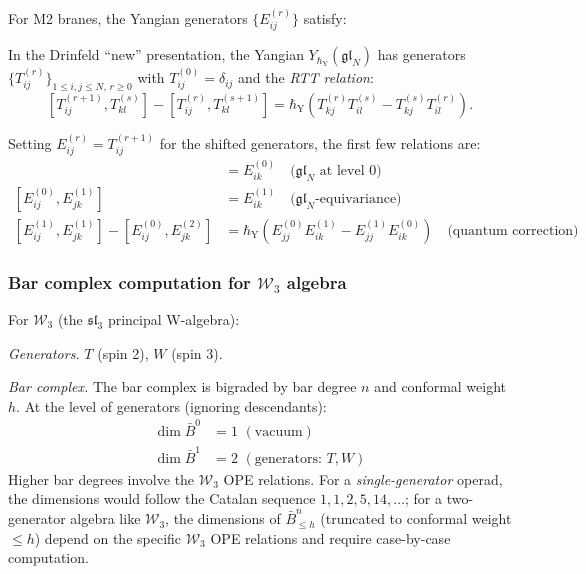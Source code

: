 \begin{calculation}
For M2 branes, the Yangian generators $\{E_{ij}^{(r)}\}$ satisfy:

In the Drinfeld ``new'' presentation, the Yangian
$Y_{\hbar_{\mathrm{Y}}}(\mathfrak{gl}_N)$ has generators
$\{T_{ij}^{(r)}\}_{1 \leq i,j \leq N,\, r \geq 0}$ with
$T_{ij}^{(0)} = \delta_{ij}$ and the \emph{RTT relation}:
\[
[T_{ij}^{(r+1)}, T_{kl}^{(s)}]
- [T_{ij}^{(r)}, T_{kl}^{(s+1)}]
=
\hbar_{\mathrm{Y}}\left(T_{kj}^{(r)} T_{il}^{(s)}
- T_{kj}^{(s)} T_{il}^{(r)}\right).
\]

Setting $E_{ij}^{(r)} = T_{ij}^{(r+1)}$ for the shifted generators, the first few relations are:
\begin{align}
[E_{ij}^{(0)}, E_{jk}^{(0)}] &= E_{ik}^{(0)} \quad \text{($\mathfrak{gl}_N$ at level 0)}\\
[E_{ij}^{(0)}, E_{jk}^{(1)}] &= E_{ik}^{(1)} \quad \text{($\mathfrak{gl}_N$-equivariance)}\\
[E_{ij}^{(1)}, E_{jk}^{(1)}] - [E_{ij}^{(0)}, E_{jk}^{(2)}] &= \hbar_{\mathrm{Y}}\left(E_{jj}^{(0)} E_{ik}^{(1)} - E_{jj}^{(1)} E_{ik}^{(0)}\right) \quad \text{(quantum correction)}
\end{align}
\end{calculation}

\subsubsection{\texorpdfstring{Bar complex computation for $\mathcal{W}_3$ algebra}{Bar complex computation for W 3 algebra}}

\begin{example}\label{ex:w3-bar}
For $\mathcal{W}_3$ (the $\mathfrak{sl}_3$ principal W-algebra):

\emph{Generators.} $T$ (spin 2), $W$ (spin 3).

\emph{Bar complex.}
The bar complex is bigraded by bar degree $n$ and conformal weight $h$. At the level of generators (ignoring descendants):
\begin{align}
\dim \bar{B}^0 &= 1 \,\, (\text{vacuum}) \\
\dim \bar{B}^1 &= 2 \,\, (\text{generators: } T, W)
\end{align}
Higher bar degrees involve the $\mathcal{W}_3$ OPE relations. For a \emph{single-generator} operad, the dimensions would follow the Catalan sequence $1, 1, 2, 5, 14, \ldots$; for a two-generator algebra like $\mathcal{W}_3$, the dimensions of $\bar{B}^n_{\leq h}$ (truncated to conformal weight $\leq h$) depend on the specific $\mathcal{W}_3$ OPE relations and require case-by-case computation.
\end{example}

